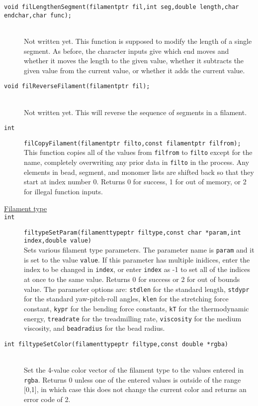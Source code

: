 \documentclass {scrbook}
\newcommand {\ttt} {\texttt}
\begin{document}
\begin{description}
\item[\ttt{void filLengthenSegment(filamentptr fil,int seg,double length,char endchar,char func);}]
\hfill \\
Not written yet. This function is supposed to modify the length of a single segment. As before, the character inputs give which end moves and whether it moves the length to the given value, whether it subtracts the given value from the current value, or whether it adds the current value.

\item[\ttt{void filReverseFilament(filamentptr fil);}]
\hfill \\
Not written yet. This will reverse the sequence of segments in a filament.

\item[\ttt{int}]
\ttt{filCopyFilament(filamentptr filto,const filamentptr filfrom);}
\hfill \\
This function copies all of the values from \ttt{filfrom} to \ttt{filto} except for the name, completely overwriting any prior data in \ttt{filto} in the process. Any elements in bead, segment, and monomer lists are shifted back so that they start at index number 0. Returns 0 for success, 1 for out of memory, or 2 for illegal function inputs.

\item[\underline{Filament type}]

\item[\ttt{int}]
\ttt{filtypeSetParam(filamenttypeptr filtype,const char *param,int index,double value)}
\hfill \\
Sets various filament type parameters. The parameter name is \ttt{param} and it is set to the value \ttt{value}. If this parameter has multiple inidices, enter the index to be changed in \ttt{index}, or enter \ttt{index} as -1 to set all of the indices at once to the same value. Returns 0 for success or 2 for out of bounds value. The parameter options are: \ttt{stdlen} for the standard length, \ttt{stdypr} for the standard yaw-pitch-roll angles, \ttt{klen} for the stretching force constant, \ttt{kypr} for the bending force constants, \ttt{kT} for the thermodynamic energy, \ttt{treadrate} for the treadmilling rate, \ttt{viscosity} for the medium viscosity, and \ttt{beadradius} for the bead radius.

\item[\ttt{int filtypeSetColor(filamenttypeptr filtype,const double *rgba)}]
\hfill \\
Set the 4-value color vector of the filament type to the values entered in \ttt{rgba}. Returns 0 unless one of the entered values is outside of the range [0,1], in which case this does not change the current color and returns an error code of 2.


\end{description}
\end{document}
